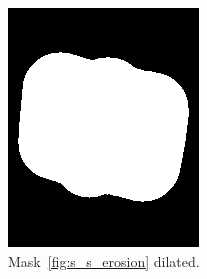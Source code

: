 \documentclass{article}
\begin{document}
\begin{figure}
\begin{subfigure}{0.3\textwidth}
    \includegraphics[width=\linewidth]{pictures/remove_knobs_expansion.png}
    \caption{Mask~\ref{fig:s_s_erosion} dilated.}
    \label{fig:s_s_dilatation}
  \end{subfigure}
  \vspace{1cm}
  \begin{subfigure}{0.3\textwidth}
    \centering

\end{subfigure}
\end{figure}
\end{document}
